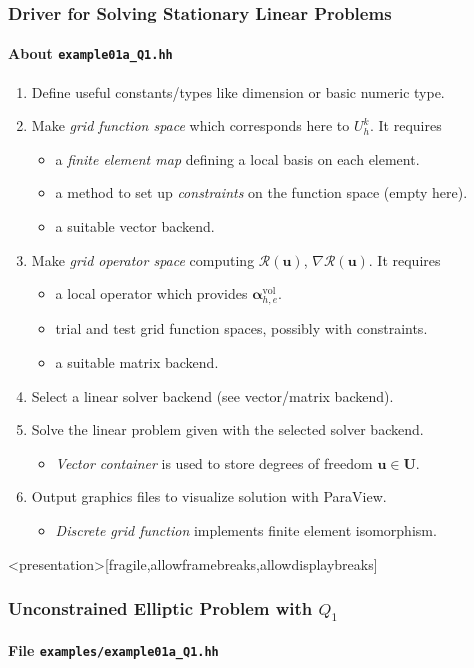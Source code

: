 \begin{frame}
\frametitle{Driver for Solving Stationary Linear Problems}
\framesubtitle{About \lstinline{example01a_Q1.hh}}
\begin{enumerate}
\item Define useful constants/types like dimension or basic numeric type.
\item Make \textit{grid function space} which corresponds here to $U_h^k$. It requires
\begin{itemize}
\item a \textit{finite element map} defining a local basis on each element.
\item a method to set up \textit{constraints} on the function space (empty here).
\item a suitable vector backend.
\end{itemize}
\item Make \textit{grid operator space} computing $\mathcal{R}(\mathbf{u})$, $\nabla\mathcal{R}(\mathbf{u})$. It requires
\begin{itemize}
\item a local operator which provides $\bm{\alpha}_{h,e}^{\text{vol}}$.
\item trial and test grid function spaces, possibly with constraints.
\item a suitable matrix backend.
\end{itemize}
\item Select a linear solver backend (see vector/matrix backend).
\item Solve the linear problem given with the selected solver backend.
\begin{itemize}
\item \textit{Vector container} is used to store degrees of freedom $\mathbf{u}\in\mathbf{U}$.
\end{itemize}
\item Output graphics files to visualize solution with ParaView.
\begin{itemize}
\item \textit{Discrete grid function} implements finite element isomorphism.
\end{itemize}
\end{enumerate}
\end{frame}


\begin{frame}<presentation>[fragile,allowframebreaks,allowdisplaybreaks]
\frametitle<presentation>{Unconstrained Elliptic Problem with $Q_1$}
\framesubtitle<presentation>{File \texttt{examples/example01a\_Q1.hh}}

\end{frame}


